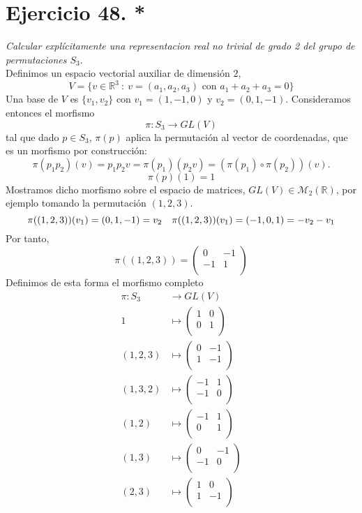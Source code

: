 \section{Ejercicio 48. *}
\emph{Calcular explícitamente una representacion real no trivial de grado 2 del grupo de permutaciones \(S_{3}\)}.\\

Definimos un espacio vectorial auxiliar de dimensión \(2\),
\[
  V = \Big\{ v \in \mathbb{R}^{3} \ : \ v = (a_{1},a_{2},a_{3}) \text{ con } a_{1}+a_{2}+a_{3} = 0 \Big\}
\]
Una base de \(V\) es \(\{v_{1}, v_{2}\}\) con \(v_{1} = (1,-1,0)\) y \(v_{2} = (0,1,-1)\). Consideramos entonces el morfismo
\[
  \pi: S_{3} \to GL(V)
\]
tal que dado \(p \in S_{3}\), \(\pi(p)\) aplica la permutación al vector de coordenadas, que es un morfismo por construcción:
\[
  \pi(p_{1}p_{2})(v) = p_{1}p_{2}v = \pi(p_{1})(p_{2}v) = (\pi(p_{1})\circ \pi(p_{2})) (v).
\]
\[
  \pi(p)(1) = 1
\]
Mostramos dicho morfismo sobre el espacio de matrices, \(GL(V) \in \mathcal{M}_{2}(\mathbb{R})\), por ejemplo tomando la permutación \((1,2,3)\).
\[
  \pi((1,2,3))(v_{1}) = (0,1,-1) = v_{2} \quad \pi((1,2,3))(v_{1}) = (-1,0,1) = -v_{2}-v_{1}\\
\]
Por tanto,
\[
  \pi((1,2,3)) = \begin{pmatrix} 0 & -1\\ -1 & 1 \\ \end{pmatrix}
\]
Definimos de esta forma el morfismo completo
\[
  \begin{aligned}
    \pi: S_{3} &\to GL(V)\\
    1 &\mapsto  \begin{pmatrix} 1 & 0\\ 0 & 1 \\ \end{pmatrix}\\
    (1,2,3) &\mapsto  \begin{pmatrix} 0 & -1\\ 1 & -1 \\ \end{pmatrix}\\
    (1,3,2) &\mapsto  \begin{pmatrix} -1 & 1\\ -1 & 0 \\ \end{pmatrix}\\
    (1,2) &\mapsto  \begin{pmatrix} -1 & 1\\ 0 & 1 \\ \end{pmatrix}\\
    (1,3) &\mapsto  \begin{pmatrix} 0 & -1\\ -1 & 0 \\ \end{pmatrix}\\
    (2,3) &\mapsto  \begin{pmatrix} 1 & 0\\ 1 & -1 \\ \end{pmatrix}\\
  \end{aligned}
\]
